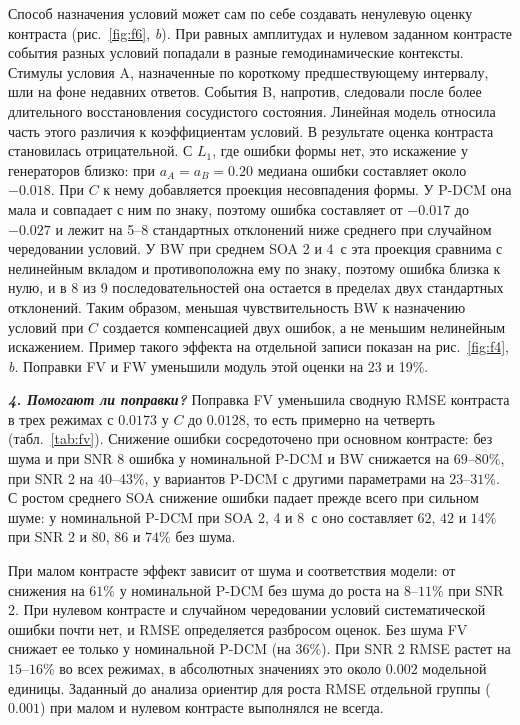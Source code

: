Способ назначения условий может сам по себе создавать ненулевую оценку контраста (рис.~\ref{fig:f6}, \textit{b}). При равных амплитудах и нулевом заданном контрасте события разных условий попадали в разные гемодинамические контексты. Стимулы условия A, назначенные по короткому предшествующему интервалу, шли на фоне недавних ответов. События B, напротив, следовали после более длительного восстановления сосудистого состояния. Линейная модель относила часть этого различия к коэффициентам условий. В результате оценка контраста становилась отрицательной. С $L_1$, где ошибки формы нет, это искажение у генераторов близко: при $a_A=a_B=0.20$ медиана ошибки составляет около $-0.018$. При $C$ к нему добавляется проекция несовпадения формы. У P-DCM она мала и совпадает с ним по знаку, поэтому ошибка составляет от $-0.017$ до $-0.027$ и лежит на 5--8 стандартных отклонений ниже среднего при случайном чередовании условий. У BW при среднем SOA 2 и 4~с эта проекция сравнима с нелинейным вкладом и противоположна ему по знаку, поэтому ошибка близка к нулю, и в 8 из 9 последовательностей она остается в пределах двух стандартных отклонений. Таким образом, меньшая чувствительность BW к назначению условий при $C$ создается компенсацией двух ошибок, а не меньшим нелинейным искажением. Пример такого эффекта на отдельной записи показан на рис.~\ref{fig:f4}, \textit{b}. Поправки FV и FW уменьшили модуль этой оценки на 23 и 19\%.

\FloatBarrier

\textbf{\textit{4. Помогают ли поправки?}} Поправка FV уменьшила сводную RMSE контраста в трех режимах с $0.0173$ у $C$ до $0.0128$, то есть примерно на четверть (табл.~\ref{tab:fv}). Снижение ошибки сосредоточено при основном контрасте: без шума и при SNR 8 ошибка у номинальной P-DCM и BW снижается на $69$--$80\%$, при SNR 2 на $40$--$43\%$, у вариантов P-DCM с другими параметрами на $23$--$31\%$. С ростом среднего SOA снижение ошибки падает прежде всего при сильном шуме: у номинальной P-DCM при SOA 2, 4 и 8~с оно составляет $62$, $42$ и $14\%$ при SNR 2 и $80$, $86$ и $74\%$ без шума.

При малом контрасте эффект зависит от шума и соответствия модели: от снижения на $61\%$ у номинальной P-DCM без шума до роста на $8$--$11\%$ при SNR 2. При нулевом контрасте и случайном чередовании условий систематической ошибки почти нет, и RMSE определяется разбросом оценок. Без шума FV снижает ее только у номинальной P-DCM (на $36\%$). При SNR 2 RMSE растет на $15$--$16\%$ во всех режимах, в абсолютных значениях это около $0.002$ модельной единицы. Заданный до анализа ориентир для роста RMSE отдельной группы ($0.001$) при малом и нулевом контрасте выполнялся не всегда.

